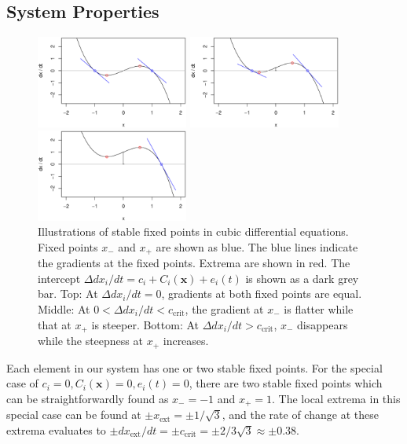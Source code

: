 \documentclass[conference]{IEEEtran}
\newcommand{\vectorsym}[1]{\ensuremath{\mathbf{#1}}}
\newcommand{\xextremum}{\ensuremath{x_{\mathrm{ext}}}}
\newcommand{\ccrit}{\ensuremath{c_{\mathrm{crit}}}}
\newcommand{\agentimpact}{\ensuremath{e}}
\newcommand{\couplingfunction}{\ensuremath{C}}
\begin{document}
\subsection{System Properties}

\begin{figure}

  \centerline{\includegraphics[width=5cm]{cubicdemo_intercept000.eps}}

  \centerline{\includegraphics[width=5cm]{cubicdemo_intercept025.eps}}

  \centerline{\includegraphics[width=5cm]{cubicdemo_intercept100.eps}}

  \caption{Illustrations of stable fixed points in cubic differential
    equations. Fixed points $x_{-}$ and $x_{+}$ are shown as blue. The
    blue lines indicate the gradients at the fixed points. Extrema are
    shown in red. The intercept
    $\Delta dx_i / dt = c_i + \couplingfunction_i(\vectorsym{x}) + \agentimpact_i(t)$ is
    shown as a dark grey bar. Top: At $\Delta dx_i / dt = 0$,
    gradients at both fixed points are equal. Middle: At
    $0 < \Delta dx_i / dt < \ccrit$, the gradient at $x_{-}$ is flatter
    while that at $x_{+}$ is steeper. Bottom: At
    $\Delta dx_i / dt > \ccrit$, $x_{-}$ disappears while the steepness
    at $x_{+}$ increases.}
  \label{fig_cubicdemo}

\end{figure}

Each element in our system has one or two stable fixed points. For the
special case of
$c_i = 0, \couplingfunction_i(\vectorsym{x}) = 0, \agentimpact_i(t) = 0$, there are two
stable fixed points which can be straightforwardly found as
$x_{-} = -1$ and $x_{+} = 1$. The local extrema in this special case
can be found at $\pm \xextremum = \pm 1 / \sqrt{3}$, and the rate of
change at these extrema evaluates to
$\pm d\xextremum / dt = \pm \ccrit = \pm 2 / 3\sqrt{3} \approx \pm
0.38$.
\end{document}
